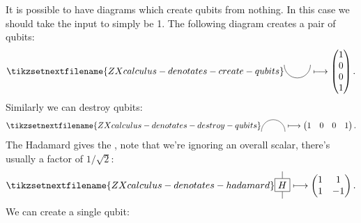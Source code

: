 \documentclass[fleqn]{NotesClass}
\begin{document}
    It is possible to have diagrams which create qubits from nothing.
    In this case we should take the input to simply be 1.
    The following diagram creates a pair of qubits:
    \begin{equation}
        \tikzsetnextfilename{ZXcalculus-denotates-create-qubits}
        \begin{tikzpicture}[baseline=-0.35cm]
            \draw (0, 0) arc (-180:0:0.5);
        \end{tikzpicture}
        \longmapsto
        \begin{pmatrix}
            1\\ 0\\ 0\\ 1
        \end{pmatrix}
        .
    \end{equation}
    Similarly we can destroy qubits:
    \begin{equation}
        \tikzsetnextfilename{ZXcalculus-denotates-destroy-qubits}
        \begin{tikzpicture}[baseline=0.15cm]
            \draw (0, 0) arc (180:0:0.5);
        \end{tikzpicture}
        \longmapsto
        \begin{pmatrix}
            1 & 0 & 0 & 1
        \end{pmatrix}
        .
    \end{equation}
    The Hadamard gives the , note that we're ignoring an overall scalar, there's usually a factor of \(1/\sqrt{2}\):
    \begin{equation}
        \tikzsetnextfilename{ZXcalculus-denotates-hadamard}
        \begin{tikzpicture}[baseline=(H.base)]
            \node[draw] (H) {\(H\)};
            \draw (H) -- ++ (0, 0.5);
            \draw (H) -- ++ (0, -0.5);
        \end{tikzpicture}
        \longmapsto
        \begin{pmatrix}
            1 & 1\\
            1 & -1
        \end{pmatrix}
        .
    \end{equation}
    We can create a single qubit:
\end{document}
